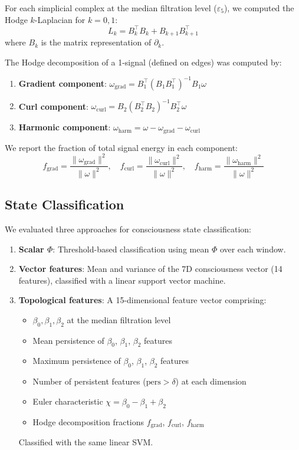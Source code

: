 \documentclass[11pt,a4paper]{article}
\begin{document}
For each simplicial complex at the median filtration level ($\varepsilon_5$), we computed the Hodge $k$-Laplacian for $k = 0, 1$:
\[
L_k = B_k^\top B_k + B_{k+1} B_{k+1}^\top
\]
where $B_k$ is the matrix representation of $\partial_k$.

The Hodge decomposition of a 1-signal (defined on edges) was computed by:
\begin{enumerate}
  \item \textbf{Gradient component}: $\omega_{\mathrm{grad}} = B_1^\top (B_1 B_1^\top)^{-1} B_1 \omega$
  \item \textbf{Curl component}: $\omega_{\mathrm{curl}} = B_2 (B_2^\top B_2)^{-1} B_2^\top \omega$
  \item \textbf{Harmonic component}: $\omega_{\mathrm{harm}} = \omega - \omega_{\mathrm{grad}} - \omega_{\mathrm{curl}}$
\end{enumerate}
We report the fraction of total signal energy in each component:
\[
f_{\mathrm{grad}} = \frac{\|\omega_{\mathrm{grad}}\|^2}{\|\omega\|^2}, \quad
f_{\mathrm{curl}} = \frac{\|\omega_{\mathrm{curl}}\|^2}{\|\omega\|^2}, \quad
f_{\mathrm{harm}} = \frac{\|\omega_{\mathrm{harm}}\|^2}{\|\omega\|^2}
\]

\subsection{State Classification}

We evaluated three approaches for consciousness state classification:

\begin{enumerate}
  \item \textbf{Scalar $\Phi$}: Threshold-based classification using mean $\Phi$ over each window.
  \item \textbf{Vector features}: Mean and variance of the 7D consciousness vector (14 features), classified with a linear support vector machine.
  \item \textbf{Topological features}: A 15-dimensional feature vector comprising:
    \begin{itemize}
      \item $\beta_0, \beta_1, \beta_2$ at the median filtration level
      \item Mean persistence of $\beta_0$, $\beta_1$, $\beta_2$ features
      \item Maximum persistence of $\beta_0$, $\beta_1$, $\beta_2$ features
      \item Number of persistent features ($\mathrm{pers} > \delta$) at each dimension
      \item Euler characteristic $\chi = \beta_0 - \beta_1 + \beta_2$
      \item Hodge decomposition fractions $f_{\mathrm{grad}}$, $f_{\mathrm{curl}}$, $f_{\mathrm{harm}}$
    \end{itemize}
    Classified with the same linear SVM.
\end{enumerate}
\end{document}
